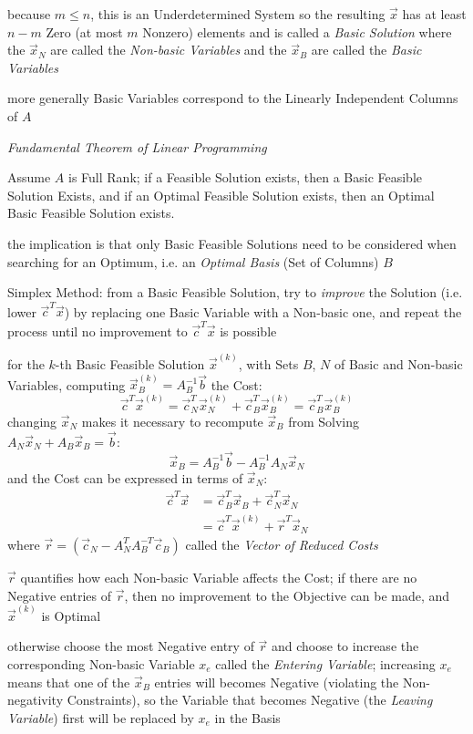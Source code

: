 because $m \leq n$, this is an Underdetermined System so the resulting
$\vec{x}$ has at least $n - m$ Zero (at most $m$ Nonzero) elements and is
called a \emph{Basic Solution} where the $\vec{x}_N$ are called the
\emph{Non-basic Variables} and the $\vec{x}_B$ are called the \emph{Basic
  Variables}

more generally Basic Variables correspond to the Linearly Independent Columns
of $A$

\emph{Fundamental Theorem of Linear Programming}

Assume $A$ is Full Rank; if a Feasible Solution exists, then a Basic Feasible
Solution Exists, and if an Optimal Feasible Solution exists, then an Optimal
Basic Feasible Solution exists.

the implication is that only Basic Feasible Solutions need to be considered
when searching for an Optimum, i.e. an \emph{Optimal Basis} (Set of Columns)
$B$

Simplex Method: from a Basic Feasible Solution, try to \emph{improve} the
Solution (i.e. lower $\vec{c}^T\vec{x}$) by replacing one Basic Variable with a
Non-basic one, and repeat the process until no improvement to
$\vec{c}^T\vec{x}$ is possible

for the $k$-th Basic Feasible Solution $\vec{x}^{(k)}$, with Sets $B$, $N$ of
Basic and Non-basic Variables, computing $\vec{x}_B^{(k)} = A_B^{-1}\vec{b}$
the Cost:
\[
  \vec{c}^T\vec{x}^{(k)} =
  \vec{c}_N^T\vec{x}_N^{(k)} + \vec{c}_B^T\vec{x}_B^{(k)} =
  \vec{c}_B^T\vec{x}_B^{(k)}
\]
changing $\vec{x}_N$ makes it necessary to recompute $\vec{x}_B$ from Solving
$A_N\vec{x}_N + A_B\vec{x}_B = \vec{b}$:
\[
  \vec{x}_B = A_B^{-1}\vec{b} - A_B^{-1}A_N\vec{x}_N
\]
and the Cost can be expressed in terms of $\vec{x}_N$:
\begin{align*}
  \vec{c}^T\vec{x} & = \vec{c}_B^T\vec{x}_B + \vec{c}_N^T\vec{x}_N \\
                   & = \vec{c}^T\vec{x}^{(k)} + \vec{r}^T\vec{x}_N
\end{align*}
where $\vec{r} = (\vec{c}_N - A_N^T A_B^{-T} \vec{c}_B)$ called the \emph{Vector
  of Reduced Costs}

$\vec{r}$ quantifies how each Non-basic Variable affects the Cost; if there are
no Negative entries of $\vec{r}$, then no improvement to the Objective can be
made, and $\vec{x}^{(k)}$ is Optimal

otherwise choose the most Negative entry of $\vec{r}$ and choose to increase
the corresponding Non-basic Variable $x_e$ called the \emph{Entering Variable};
increasing $x_e$ means that one of the $\vec{x}_B$ entries will becomes
Negative (violating the Non-negativity Constraints), so the Variable that
becomes Negative (the \emph{Leaving Variable}) first will be replaced by $x_e$
in the Basis


